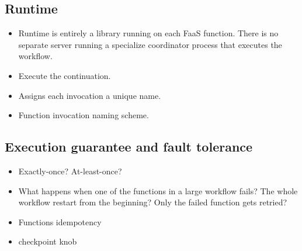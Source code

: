 \subsection{Runtime}

\begin{itemize}
	\item Runtime is entirely a library running on each FaaS function. There
	is no separate server running a specialize coordinator process that
	executes the workflow.
	\item Execute the continuation.
	\item Assigns each invocation a unique name.
	\item Function invocation naming scheme.
\end{itemize}



\subsection{Execution guarantee and fault tolerance}

\begin{itemize}
	\item Exactly-once? At-least-once?
	\item What happens when one of the functions in a large workflow fails? The whole
workflow restart from the beginning? Only the failed function gets retried?
	\item Functions idempotency
	\item \name{} checkpoint knob
\end{itemize}
